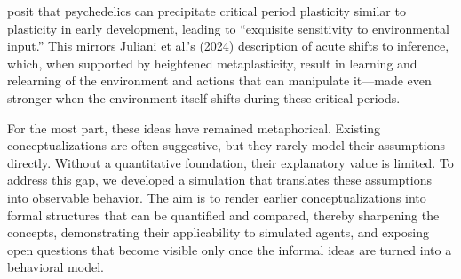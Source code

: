 \documentclass[12pt,fleqn]{article}
\begin{document}
\cite{lepow_critical_2021} posit that psychedelics can precipitate critical period plasticity similar to plasticity in early development, leading to “exquisite sensitivity to environmental input.” This mirrors Juliani et al.'s (2024) description of acute shifts to inference, which, when supported by heightened metaplasticity, result in learning and relearning of the environment and actions that can manipulate it—made even stronger when the environment itself shifts during these critical periods.

For the most part, these ideas have remained metaphorical. Existing conceptualizations are often suggestive, but they rarely model their assumptions directly. Without a quantitative foundation, their explanatory value is limited. To address this gap, we developed a simulation that translates these assumptions into observable behavior. The aim is to render earlier conceptualizations into formal structures that can be quantified and compared, thereby sharpening the concepts, demonstrating their applicability to simulated agents, and exposing open questions that become visible only once the informal ideas are turned into a behavioral model.
\end{document}
